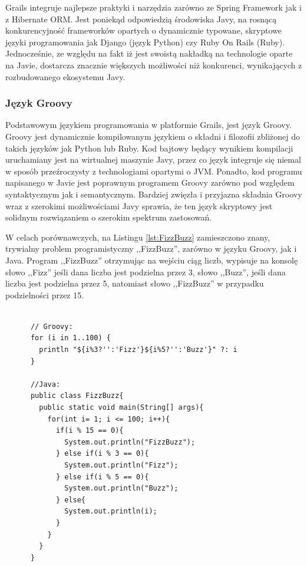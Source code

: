   Grails integruje najlepsze praktyki i narzędzia zarówno ze Spring Framework jak i z Hibernate ORM. Jest poniekąd odpowiedzią środowiska Javy, na rosnącą konkurencyjność frameworków opartych o dynamicznie typowane, skryptowe języki programowania jak Django (język Python) czy Ruby On Rails (Ruby). Jednocześnie, ze względu na fakt iż jest swoistą nakładką na technologie oparte na Javie, dostarcza znacznie większych możliwości niż konkurenci, wynikających z rozbudowanego ekosystemu Javy.


    \subsubsection{Język Groovy}

      Podstawowym językiem programowania w platformie Grails, jest język Groovy. Groovy jest dynamicznie kompilowanym językiem o składni i filozofii zbliżonej do takich języków jak Python lub Ruby. Kod bajtowy będący wynikiem kompilacji uruchamiany jest na wirtualnej maszynie Javy, przez co język integruje się niemal w sposób przeźroczysty z technologiami opartymi o JVM. Ponadto, kod programu napisanego w Javie jest poprawnym programem Groovy zarówno pod względem syntaktycznym jak i semantycznym. Bardziej zwięzła i przyjazna składnia Groovy wraz z szerokimi możliwościami Javy sprawia, że ten język skryptowy jest solidnym rozwiązaniem o szerokim spektrum zastosowań.

      W celach porównawczych, na Listingu \ref{lst:FizzBuzz} zamieszczono znany, trywialny problem programistyczny ,,FizzBuzz'', zarówno w języku Groovy, jak i Java. Program ,,FizzBuzz'' otrzymując na wejściu ciąg liczb, wypisuje na konsolę słowo ,,Fizz'' jeśli dana liczba jest podzielna przez 3, słowo ,,Buzz'', jeśli dana liczba jest podzielna przez 5, natomiast słowo ,,FizzBuzz'' w przypadku podzielności przez 15.

      \begin{lstlisting}[caption={Program FizzBuzz}, label={lst:FizzBuzz}]

      // Groovy:
      for (i in 1..100) {
        println "${i%3?'':'Fizz'}${i%5?'':'Buzz'}" ?: i
      }    

      //Java:
      public class FizzBuzz{
        public static void main(String[] args){
          for(int i= 1; i <= 100; i++){
            if(i % 15 == 0){
              System.out.println("FizzBuzz");
            } else if(i % 3 == 0){
              System.out.println("Fizz");
            } else if(i % 5 == 0){
              System.out.println("Buzz");
            } else{
              System.out.println(i);
            }
          }
        }
      }

    \end{lstlisting}

